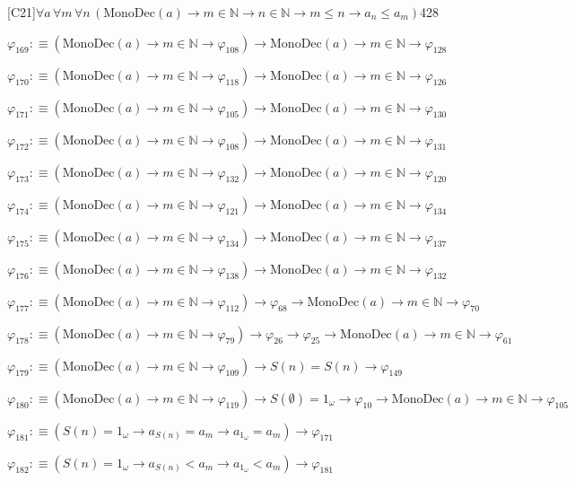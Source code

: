 \begin{fullproof}{[C21]}{$\forall a\,\forall m\,\forall n\,(\mathrm{MonoDec}(a) \to m \in \mathbb{N} \to n \in \mathbb{N} \to m \leq n \to a_{n} \leq a_{m})$}{428}
\begin{abbrevlist}
\item $\varphi_{169} :\equiv (\mathrm{MonoDec}(a) \to m \in \mathbb{N} \to \varphi_{108}) \to \mathrm{MonoDec}(a) \to m \in \mathbb{N} \to \varphi_{128}$
\item $\varphi_{170} :\equiv (\mathrm{MonoDec}(a) \to m \in \mathbb{N} \to \varphi_{118}) \to \mathrm{MonoDec}(a) \to m \in \mathbb{N} \to \varphi_{126}$
\item $\varphi_{171} :\equiv (\mathrm{MonoDec}(a) \to m \in \mathbb{N} \to \varphi_{105}) \to \mathrm{MonoDec}(a) \to m \in \mathbb{N} \to \varphi_{130}$
\item $\varphi_{172} :\equiv (\mathrm{MonoDec}(a) \to m \in \mathbb{N} \to \varphi_{108}) \to \mathrm{MonoDec}(a) \to m \in \mathbb{N} \to \varphi_{131}$
\item $\varphi_{173} :\equiv (\mathrm{MonoDec}(a) \to m \in \mathbb{N} \to \varphi_{132}) \to \mathrm{MonoDec}(a) \to m \in \mathbb{N} \to \varphi_{120}$
\item $\varphi_{174} :\equiv (\mathrm{MonoDec}(a) \to m \in \mathbb{N} \to \varphi_{121}) \to \mathrm{MonoDec}(a) \to m \in \mathbb{N} \to \varphi_{134}$
\item $\varphi_{175} :\equiv (\mathrm{MonoDec}(a) \to m \in \mathbb{N} \to \varphi_{134}) \to \mathrm{MonoDec}(a) \to m \in \mathbb{N} \to \varphi_{137}$
\item $\varphi_{176} :\equiv (\mathrm{MonoDec}(a) \to m \in \mathbb{N} \to \varphi_{138}) \to \mathrm{MonoDec}(a) \to m \in \mathbb{N} \to \varphi_{132}$
\item $\varphi_{177} :\equiv (\mathrm{MonoDec}(a) \to m \in \mathbb{N} \to \varphi_{112}) \to \varphi_{68} \to \mathrm{MonoDec}(a) \to m \in \mathbb{N} \to \varphi_{70}$
\item $\varphi_{178} :\equiv (\mathrm{MonoDec}(a) \to m \in \mathbb{N} \to \varphi_{79}) \to \varphi_{26} \to \varphi_{25} \to \mathrm{MonoDec}(a) \to m \in \mathbb{N} \to \varphi_{61}$
\item $\varphi_{179} :\equiv (\mathrm{MonoDec}(a) \to m \in \mathbb{N} \to \varphi_{109}) \to S(n) = S(n) \to \varphi_{149}$
\item $\varphi_{180} :\equiv (\mathrm{MonoDec}(a) \to m \in \mathbb{N} \to \varphi_{119}) \to S(\emptyset) = 1_{\omega} \to \varphi_{10} \to \mathrm{MonoDec}(a) \to m \in \mathbb{N} \to \varphi_{105}$
\item $\varphi_{181} :\equiv (S(n) = 1_{\omega} \to a_{S(n)} = a_{m} \to a_{1_{\omega}} = a_{m}) \to \varphi_{171}$
\item $\varphi_{182} :\equiv (S(n) = 1_{\omega} \to a_{S(n)} < a_{m} \to a_{1_{\omega}} < a_{m}) \to \varphi_{181}$

\end{abbrevlist}
\end{fullproof}

